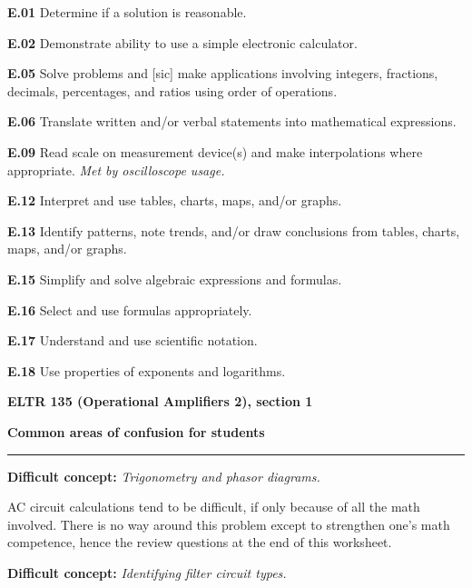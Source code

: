 \item{\bf E.01} Determine if a solution is reasonable.
\item{\bf E.02} Demonstrate ability to use a simple electronic calculator.
\item{\bf E.05} Solve problems and [sic] make applications involving integers, fractions, decimals, percentages, and ratios using order of operations.
\item{\bf E.06} Translate written and/or verbal statements into mathematical expressions.
\item{\bf E.09} Read scale on measurement device(s) and make interpolations where appropriate.  {\it Met by oscilloscope usage.}
\item{\bf E.12} Interpret and use tables, charts, maps, and/or graphs.
\item{\bf E.13} Identify patterns, note trends, and/or draw conclusions from tables, charts, maps, and/or graphs.
\item{\bf E.15} Simplify and solve algebraic expressions and formulas.
\item{\bf E.16} Select and use formulas appropriately.
\item{\bf E.17} Understand and use scientific notation.
\item{\bf E.18} Use properties of exponents and logarithms.
\medskip




\vfil \eject

\centerline{\bf ELTR 135 (Operational Amplifiers 2), section 1} \bigskip 
 
\vskip 10pt

\noindent
{\bf Common areas of confusion for students}

\vskip 5pt


\hrule \vskip 5pt

\vskip 10pt

\noindent
{\bf Difficult concept: } {\it Trigonometry and phasor diagrams.}

AC circuit calculations tend to be difficult, if only because of all the math involved.  There is no way around this problem except to strengthen one's math competence, hence the review questions at the end of this worksheet.

\vskip 10pt

\noindent
{\bf Difficult concept: } {\it Identifying filter circuit types.}

